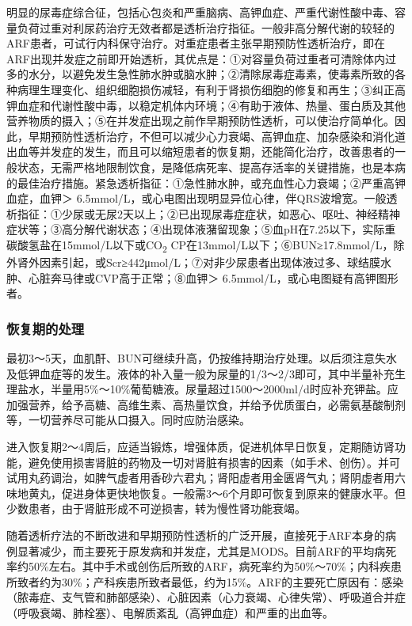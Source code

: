 明显的尿毒症综合征，包括心包炎和严重脑病、高钾血症、严重代谢性酸中毒、容量负荷过重对利尿药治疗无效者都是透析治疗指征。一般非高分解代谢的较轻的ARF患者，可试行内科保守治疗。对重症患者主张早期预防性透析治疗，即在ARF出现并发症之前即开始透析，其优点是：①对容量负荷过重者可清除体内过多的水分，以避免发生急性肺水肿或脑水肿；②清除尿毒症毒素，使毒素所致的各种病理生理变化、组织细胞损伤减轻，有利于肾损伤细胞的修复和再生；③纠正高钾血症和代谢性酸中毒，以稳定机体内环境；④有助于液体、热量、蛋白质及其他营养物质的摄入；⑤在并发症出现之前作早期预防性透析，可以使治疗简单化。因此，早期预防性透析治疗，不但可以减少心力衰竭、高钾血症、加杂感染和消化道出血等并发症的发生，而且可以缩短患者的恢复期，还能简化治疗，改善患者的一般状态，无需严格地限制饮食，是降低病死率、提高存活率的关键措施，也是本病的最佳治疗措施。紧急透析指征：①急性肺水肿，或充血性心力衰竭；②严重高钾血症，血钾＞
6.5mmol/L，或心电图出现明显异位心律，伴QRS波增宽。一般透析指征：①少尿或无尿2天以上；②已出现尿毒症症状，如恶心、呕吐、神经精神症状等；③高分解代谢状态；④出现体液潴留现象；⑤血pH在7.25以下，实际重碳酸氢盐在15mmol/L以下或CO\textsubscript{2}
CP在13mmol/L以下；⑥BUN≥17.8mmol/L，除外肾外因素引起，或Scr≥442μmol/L；⑦对非少尿患者出现体液过多、球结膜水肿、心脏奔马律或CVP高于正常；⑧血钾＞
6.5mmol/L，或心电图疑有高钾图形者。

\subsubsection{恢复期的处理}

最初3～5天，血肌酐、BUN可继续升高，仍按维持期治疗处理。以后须注意失水及低钾血症等的发生。液体的补入量一般为尿量的1/3～2/3即可，其中半量补充生理盐水，半量用5\%～10\%葡萄糖液。尿量超过1500～2000ml/d时应补充钾盐。应加强营养，给予高糖、高维生素、高热量饮食，并给予优质蛋白，必需氨基酸制剂等，一切营养尽可能从口摄入。同时应防治感染。

进入恢复期2～4周后，应适当锻炼，增强体质，促进机体早日恢复，定期随访肾功能，避免使用损害肾脏的药物及一切对肾脏有损害的因素（如手术、创伤）。并可试用丸药调治，如脾气虚者用香砂六君丸；肾阳虚者用金匮肾气丸；肾阴虚者用六味地黄丸，促进身体更快地恢复。一般需3～6个月即可恢复到原来的健康水平。但少数患者，由于肾脏形成不可逆损害，转为慢性肾功能衰竭。

随着透析疗法的不断改进和早期预防性透析的广泛开展，直接死于ARF本身的病例显著减少，而主要死于原发病和并发症，尤其是MODS。目前ARF的平均病死率约50\%左右。其中手术或创伤后所致的ARF，病死率约为50\%～70\%；内科疾患所致者约为30\%；产科疾患所致者最低，约为15\%。ARF的主要死亡原因有：感染（脓毒症、支气管和肺部感染）、心脏因素（心力衰竭、心律失常）、呼吸道合并症（呼吸衰竭、肺栓塞）、电解质紊乱（高钾血症）和严重的出血等。

